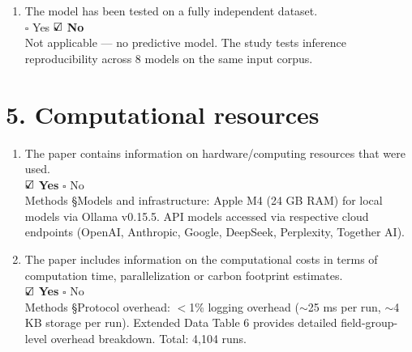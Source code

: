 \documentclass[11pt]{article}
\newcommand{\yes}{\rlap{$\checkmark$}\square}
\newcommand{\no}{\square}
\begin{document}
\begin{enumerate}[label=\Alph*.,leftmargin=2em]
\item The model has been tested on a fully independent dataset.\\
$\no$ Yes \quad $\yes$ \textbf{No}\\
{\small Not applicable --- no predictive model. The study tests inference reproducibility across 8 models on the same input corpus.}
\end{enumerate}

\section*{5. Computational resources}

\begin{enumerate}[label=\Alph*.,leftmargin=2em]
\item The paper contains information on hardware/computing resources that were used.\\
$\yes$ \textbf{Yes} \quad $\no$ No\\
{\small Methods \S Models and infrastructure: Apple M4 (24 GB RAM) for local models via Ollama v0.15.5. API models accessed via respective cloud endpoints (OpenAI, Anthropic, Google, DeepSeek, Perplexity, Together AI).}

\item The paper includes information on the computational costs in terms of computation time, parallelization or carbon footprint estimates.\\
$\yes$ \textbf{Yes} \quad $\no$ No\\
{\small Methods \S Protocol overhead: $<$1\% logging overhead ($\sim$25 ms per run, $\sim$4 KB storage per run). Extended Data Table 6 provides detailed field-group-level overhead breakdown. Total: 4,104 runs.}
\end{enumerate}
\end{document}
